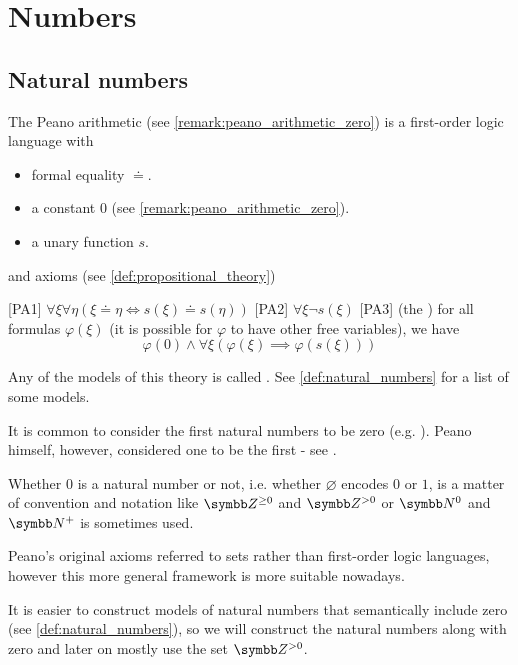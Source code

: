 \section{Numbers}\label{sec:numbers}
\subsection{Natural numbers}\label{subsec:natural_numbers}

\begin{definition}\label{def:peano_arithmetic}\cite[1]{Peano1889}
  The Peano arithmetic (see \cref{remark:peano_arithmetic_zero}) is a first-order logic language with 
  \begin{itemize}
    \item formal equality \( \doteq \).
    \item a constant \( 0 \) (see \cref{remark:peano_arithmetic_zero}).
    \item a unary function \( s \).
  \end{itemize}
  and axioms (see \cref{def:propositional_theory})
  \begin{defenum}
    [PA1] \( \forall \xi \forall \eta (\xi \doteq \eta \iff s(\xi) \doteq s(\eta)) \)
    [PA2] \( \forall \xi \neg s(\xi) \)
    [PA3] (the ) for all formulas \( \varphi(\xi) \) (it is possible for \( \varphi \) to have other free variables), we have
    \begin{equation*}
      \varphi(0) \land \forall \xi (\varphi(\xi) \implies \varphi(s(\xi)))
    \end{equation*}
  \end{defenum}

  Any of the models of this theory is called . See \cref{def:natural_numbers} for a list of some models.
\end{definition}

\begin{remark}\label{remark:peano_arithmetic_zero}
  It is common to consider the first natural numbers to be zero (e.g. \cite[67]{Enderton1977}). Peano himself, however, considered one to be the first - see \cite[1]{Peano1889}.

  Whether \( 0 \) is a natural number or not, i.e. whether \( \varnothing \) encodes \( 0 \) or \( 1 \), is a matter of convention and notation like \( \Z^{\geq 0} \) and \( \Z^{>0} \) or \( \N^0 \) and \( \N^+ \) is sometimes used.

  Peano's original axioms referred to sets rather than first-order logic languages, however this more general framework is more suitable nowadays.

  It is easier to construct models of natural numbers that semantically include zero (see \cref{def:natural_numbers}), so we will construct the natural numbers along with zero and later on mostly use the set \( \Z^{>0} \).
\end{remark}


